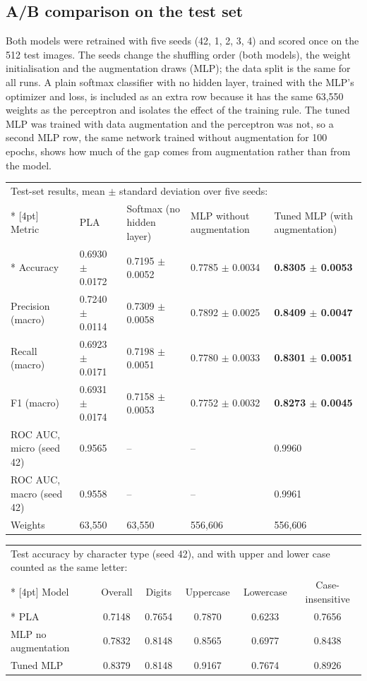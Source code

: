 \documentclass[12pt,a4paper]{article}
\begin{document}
\subsection*{A/B comparison on the test set}
Both models were retrained with five seeds (42, 1, 2, 3, 4) and scored once on the 512 test images.
The seeds change the shuffling order (both models), the weight initialisation and the augmentation
draws (MLP); the data split is the same for all runs. A plain softmax classifier with no hidden
layer, trained with the MLP's optimizer and loss, is included as an extra row because it has the
same 63,550 weights as the perceptron and isolates the effect of the training rule. The tuned MLP
was trained with data augmentation and the perceptron was not, so a second MLP row, the same
network trained without augmentation for 100 epochs, shows how much of the gap comes from
augmentation rather than from the model.

{\small\setlength{\tabcolsep}{4pt}
\begin{longtable}{p{2.8cm}p{2.7cm}p{2.8cm}p{2.8cm}p{3.4cm}}
\multicolumn{5}{l}{\parbox[t]{14.5cm}{Test-set results, mean $\pm$ standard deviation over five seeds:}} \\*
[4pt]
\toprule
Metric & PLA & Softmax (no hidden layer) & MLP without augmentation & Tuned MLP (with augmentation) \\*
\midrule
Accuracy & 0.6930 $\pm$ 0.0172 & 0.7195 $\pm$ 0.0052 & 0.7785 $\pm$ 0.0034 & \textbf{0.8305 $\pm$ 0.0053} \\
Precision (macro) & 0.7240 $\pm$ 0.0114 & 0.7309 $\pm$ 0.0058 & 0.7892 $\pm$ 0.0025 & \textbf{0.8409 $\pm$ 0.0047} \\
Recall (macro) & 0.6923 $\pm$ 0.0171 & 0.7198 $\pm$ 0.0051 & 0.7780 $\pm$ 0.0033 & \textbf{0.8301 $\pm$ 0.0051} \\
F1 (macro) & 0.6931 $\pm$ 0.0174 & 0.7158 $\pm$ 0.0053 & 0.7752 $\pm$ 0.0032 & \textbf{0.8273 $\pm$ 0.0045} \\
ROC AUC, micro (seed 42) & 0.9565 & -- & -- & 0.9960 \\
ROC AUC, macro (seed 42) & 0.9558 & -- & -- & 0.9961 \\
Weights & 63{,}550 & 63{,}550 & 556{,}606 & 556{,}606 \\
\bottomrule
\end{longtable}
}

{\small\setlength{\tabcolsep}{4pt}
\begin{longtable}{lccccc}
\multicolumn{6}{l}{\parbox[t]{14.5cm}{Test accuracy by character type (seed 42), and with upper and lower case counted as the same letter:}} \\*
[4pt]
\toprule
Model & Overall & Digits & Uppercase & Lowercase & Case-insensitive \\*
\midrule
PLA & 0.7148 & 0.7654 & 0.7870 & 0.6233 & 0.7656 \\
MLP no augmentation & 0.7832 & 0.8148 & 0.8565 & 0.6977 & 0.8438 \\
Tuned MLP & 0.8379 & 0.8148 & 0.9167 & 0.7674 & 0.8926 \\
\bottomrule
\end{longtable}
}
\end{document}
